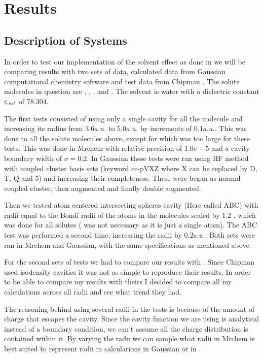 \documentclass[../master_thesis.tex]{subfiles}
\begin{document}
\chapter{Results}\label{chap:Results}
\section{Description of Systems}
In order to test our implementation of the solvent effect as done in \cite{FossoTande:2013ka}
we will be comparing results with two sets of data, calculated data from Gaussian
computational chemistry software and test data from Chipman \cite{Chipman2002}.
The solute molecules in question are , , ,
 and . The solvent is water with a dielectric constant
$\epsilon_{out}$ of $78.304$.

The first tests consisted of using only a single cavity for all the molecule and
increasing its radius from $3.6 a.u.$ to $5.0 a.u.$ by increments of $0.1 a.u.$.
This was done to all the solute molecules above, except for   which
was too large for these tests. This was done in Mrchem with relative precision of
$1.0e-5$ and a cavity boundary width of $\sigma = 0.2$. In Gaussian these tests were
ran using \ac{HF} method with coupled cluster basis sets (keyword cc-pVXZ where X
can be replaced by D, T, Q and 5) and increasing their completeness. These were
began as normal coupled cluster, then augmented and finally double augmented.

Then we tested atom centered intersecting spheres cavity (Here called \ac{ABC})
with radii equal to the Bondi radii of the atoms in the molecules \cite{doi:10.1021/j100785a001} scaled by $1.2$
\cite{Tomasi:1994wt}, which was done for all solutes ( was not necessary as it
is just a single atom). The \ac{ABC} test was performed a second time, increasing the radii by $0.2 a.u.$.
Both sets were ran in Mrchem and Gaussian, with the same specifications as mentioned above.

For the second sets of tests we had to compare our results with \cite{Chipman2002}.
Since Chipman used isodensity cavities it was not as simple to reproduce their results.
In order to be able to compare my results with theirs I decided to compare all my
calculations across all radii and see what trend they had.

The reasoning behind using several radii in the tests is because of the amount of
charge that escapes the cavity. Since the cavity function we are using is analytical
instead of a boundary condition, we can't assume all the charge distribution
is contained within it. By varying the radii we can sample what radii in Mrchem
is best suited to represent radii in calculations in Gaussian or in \cite{Chipman2002}.
\end{document}

